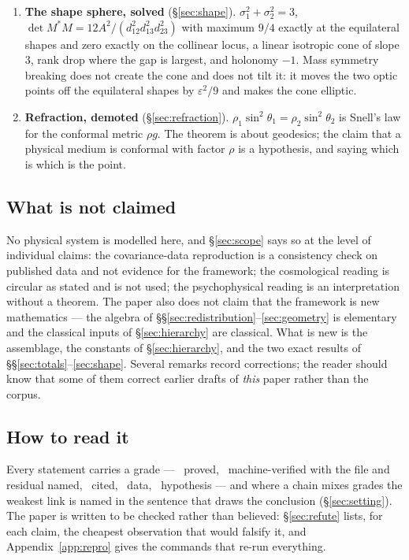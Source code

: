 \begin{enumerate}[label=\textbf{C\arabic*.},leftmargin=2.2em]
\item \textbf{The shape sphere, solved} (\S\ref{sec:shape}). $\sigma_1^2+\sigma_2^2=3$,
$\det M^*M=12A^2/(d_{12}^2d_{13}^2d_{23}^2)$ with maximum $9/4$ exactly at the equilateral shapes
and zero exactly on the collinear locus, a linear isotropic cone of slope $3$, rank drop where the
gap is largest, and holonomy $-1$. Mass symmetry breaking does not create the cone and does not
tilt it: it moves the two optic points off the equilateral shapes by $\varepsilon^2/9$ and makes
the cone elliptic.

\item \textbf{Refraction, demoted} (\S\ref{sec:refraction}). $\rho_1\sin^2\theta_1=\rho_2\sin^2
\theta_2$ is Snell's law for the conformal metric $\rho g$. The theorem is about geodesics; the
claim that a physical medium is conformal with factor $\rho$ is a hypothesis, and saying which is
which is the point.
\end{enumerate}

\subsection{What is not claimed}

No physical system is modelled here, and \S\ref{sec:scope} says so at the level of individual
claims: the covariance-data reproduction is a consistency check on published data and not
evidence for the framework; the cosmological reading is circular as stated and is not used; the
psychophysical reading is an interpretation without a theorem. The paper also does not claim that
the framework is new mathematics --- the algebra of \S\S\ref{sec:redistribution}--\ref{sec:geometry}
is elementary and the classical inputs of \S\ref{sec:hierarchy} are classical. What is new is the
assemblage, the constants of \S\ref{sec:hierarchy}, and the two exact results of
\S\S\ref{sec:totals}--\ref{sec:shape}. Several remarks record corrections; the reader should know
that some of them correct earlier drafts of \emph{this} paper rather than the corpus.

\subsection{How to read it}

Every statement carries a grade --- \T\ proved, \V\ machine-verified with the file and residual
named, \Cc\ cited, \Dd\ data, \Hh\ hypothesis --- and where a chain mixes grades the weakest link
is named in the sentence that draws the conclusion (\S\ref{sec:setting}). The paper is written to
be checked rather than believed: \S\ref{sec:refute} lists, for each claim, the cheapest
observation that would falsify it, and Appendix~\ref{app:repro} gives the commands that
re-run everything.

